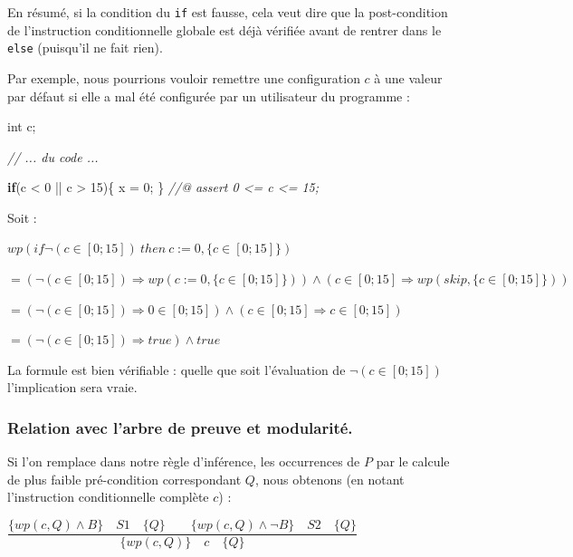 \documentclass[12pt,francais,]{scrbook}
\newenvironment{Shaded}{}{}
\newcommand{\KeywordTok}[1]{\textcolor[rgb]{0.00,0.44,0.13}{\textbf{{#1}}}}
\newcommand{\DataTypeTok}[1]{\textcolor[rgb]{0.56,0.13,0.00}{{#1}}}
\newcommand{\DecValTok}[1]{\textcolor[rgb]{0.25,0.63,0.44}{{#1}}}
\newcommand{\CommentTok}[1]{\textcolor[rgb]{0.38,0.63,0.69}{\textit{{#1}}}}
\newcommand{\NormalTok}[1]{{#1}}
\begin{document}
En résumé, si la condition du \texttt{if} est fausse, cela veut dire que
la post-condition de l'instruction conditionnelle globale est déjà
vérifiée avant de rentrer dans le \texttt{else} (puisqu'il ne fait
rien).

Par exemple, nous pourrions vouloir remettre une configuration \(c\) à
une valeur par défaut si elle a mal été configurée par un utilisateur du
programme :

\begin{footnotesize}\begin{Shaded}
\begin{Highlighting}[]
\DataTypeTok{int} \NormalTok{c;}

\CommentTok{// ... du code ...}

\KeywordTok{if}\NormalTok{(c < }\DecValTok{0} \NormalTok{|| c > }\DecValTok{15}\NormalTok{)\{}
  \NormalTok{x = }\DecValTok{0}\NormalTok{;}
\NormalTok{\}}
\CommentTok{//@ assert 0 <= c <= 15;}
\end{Highlighting}
\end{Shaded}\end{footnotesize}

Soit :

\(wp(if \neg (c \in [0;15])\ then\ c := 0, \{c \in [0;15]\})\)

\(= (\neg (c \in [0;15])\Rightarrow wp(c := 0, \{c \in [0;15]\})) \wedge (c \in [0;15]\Rightarrow wp(skip, \{c \in [0;15]\}))\)

\(= (\neg (c \in [0;15]) \Rightarrow 0 \in [0;15]) \wedge (c \in [0;15] \Rightarrow c \in [0;15])\)

\(= (\neg (c \in [0;15]) \Rightarrow true) \wedge true\)

La formule est bien vérifiable : quelle que soit l'évaluation de
\(\neg (c \in [0;15])\) l'implication sera vraie.

\subsubsection{Relation avec l'arbre de preuve et
modularité.}\label{relation-avec-larbre-de-preuve-et-modularituxe9.}

Si l'on remplace dans notre règle d'inférence, les occurrences de \(P\)
par le calcule de plus faible pré-condition correspondant \(Q\), nous
obtenons (en notant l'instruction conditionnelle complète \(c\)) :

\begin{center}
\(\dfrac{\{wp(c,Q) \wedge B\}\quad S1\quad \{Q\} \quad \quad \{wp(c,Q) \wedge \neg B\}\quad S2\quad \{Q\}}{\{wp(c,Q)\}\quad c\quad \{Q\}}\)\end{center}
\end{document}
